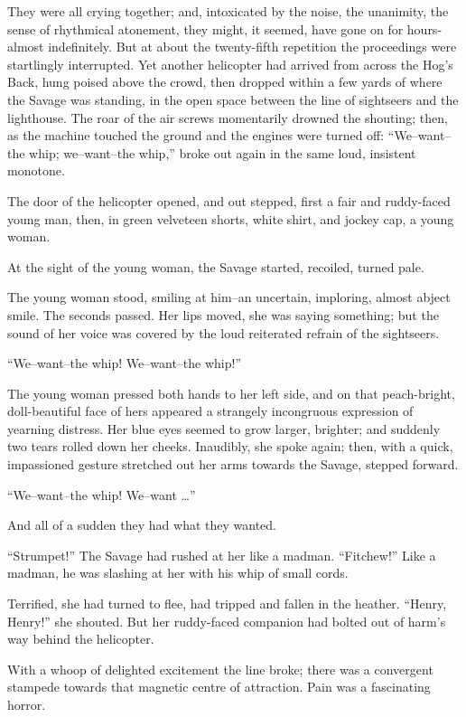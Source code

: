 \documentclass[12pt]{report}
\begin{document}
They were all crying together; and, intoxicated by the noise, the
unanimity, the sense of rhythmical atonement, they might, it seemed,
have gone on for hours-almost indefinitely. But at about the
twenty-fifth repetition the proceedings were startlingly interrupted.
Yet another helicopter had arrived from across the Hog's Back, hung
poised above the crowd, then dropped within a few yards of where the
Savage was standing, in the open space between the line of sightseers
and the lighthouse. The roar of the air screws momentarily drowned the
shouting; then, as the machine touched the ground and the engines were
turned off: ``We--want--the whip; we--want--the whip,'' broke out again
in the same loud, insistent monotone.

The door of the helicopter opened, and out stepped, first a fair and
ruddy-faced young man, then, in green velveteen shorts, white shirt, and
jockey cap, a young woman.

At the sight of the young woman, the Savage started, recoiled, turned
pale.

The young woman stood, smiling at him--an uncertain, imploring, almost
abject smile. The seconds passed. Her lips moved, she was saying
something; but the sound of her voice was covered by the loud reiterated
refrain of the sightseers.

``We--want--the whip! We--want--the whip!''

The young woman pressed both hands to her left side, and on that
peach-bright, doll-beautiful face of hers appeared a strangely
incongruous expression of yearning distress. Her blue eyes seemed to
grow larger, brighter; and suddenly two tears rolled down her cheeks.
Inaudibly, she spoke again; then, with a quick, impassioned gesture
stretched out her arms towards the Savage, stepped forward.

``We--want--the whip! We--want \ldots{}''

And all of a sudden they had what they wanted.

``Strumpet!'' The Savage had rushed at her like a madman. ``Fitchew!''
Like a madman, he was slashing at her with his whip of small cords.

Terrified, she had turned to flee, had tripped and fallen in the
heather. ``Henry, Henry!'' she shouted. But her ruddy-faced companion
had bolted out of harm's way behind the helicopter.

With a whoop of delighted excitement the line broke; there was a
convergent stampede towards that magnetic centre of attraction. Pain was
a fascinating horror.
\end{document}
